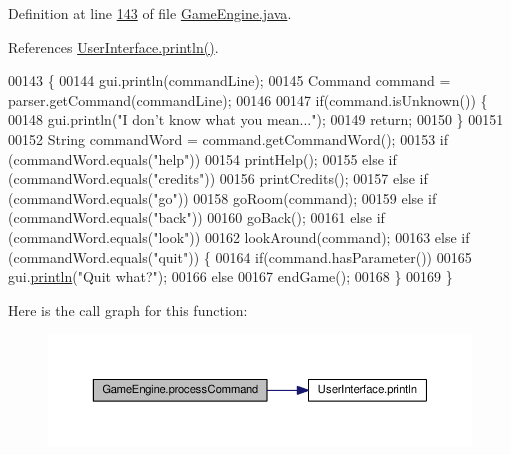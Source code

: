 Definition at line \hyperlink{GameEngine_8java_source_l00143}{143} of file \hyperlink{GameEngine_8java_source}{Game\-Engine.\-java}.



References \hyperlink{UserInterface_8java_source_l00060}{User\-Interface.\-println()}.


\begin{DoxyCode}
00143                                                    \{
00144         gui.println(commandLine);
00145         Command command = parser.getCommand(commandLine);
00146 
00147         \textcolor{keywordflow}{if}(command.isUnknown()) \{
00148             gui.println(\textcolor{stringliteral}{"I don't know what you mean..."});
00149             \textcolor{keywordflow}{return};
00150         \}
00151 
00152         String commandWord = command.getCommandWord();
00153         \textcolor{keywordflow}{if} (commandWord.equals(\textcolor{stringliteral}{"help"}))
00154             printHelp();
00155         \textcolor{keywordflow}{else} \textcolor{keywordflow}{if} (commandWord.equals(\textcolor{stringliteral}{"credits"}))
00156             printCredits();
00157         \textcolor{keywordflow}{else} \textcolor{keywordflow}{if} (commandWord.equals(\textcolor{stringliteral}{"go"}))
00158             goRoom(command);
00159         \textcolor{keywordflow}{else} \textcolor{keywordflow}{if} (commandWord.equals(\textcolor{stringliteral}{"back"}))
00160             goBack();
00161         \textcolor{keywordflow}{else} \textcolor{keywordflow}{if} (commandWord.equals(\textcolor{stringliteral}{"look"}))
00162             lookAround(command);
00163         \textcolor{keywordflow}{else} \textcolor{keywordflow}{if} (commandWord.equals(\textcolor{stringliteral}{"quit"})) \{
00164             \textcolor{keywordflow}{if}(command.hasParameter())
00165                 gui.\hyperlink{classUserInterface_a79f606b4b1f5d1523e50eea00039ed94}{println}(\textcolor{stringliteral}{"Quit what?"});
00166             \textcolor{keywordflow}{else}
00167                 endGame();
00168         \}
00169     \}
\end{DoxyCode}


Here is the call graph for this function\-:
\nopagebreak
\begin{figure}[H]
\begin{center}
\leavevmode
\includegraphics[width=350pt]{classGameEngine_ad7133885f313fa99bca3bb7cb8272f64_cgraph}
\end{center}
\end{figure}


